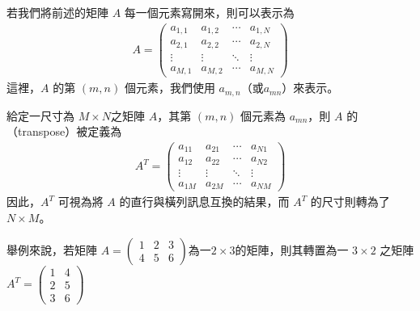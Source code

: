 \documentclass[letterpaper,10pt,english]{sphinxmanual}
\begin{document}
若我們將前述的矩陣 \(A\) 每一個元素寫開來，則可以表示為
\begin{equation*}
\begin{split}
A =
 \begin{pmatrix}
  a_{1,1} & a_{1,2} & \cdots & a_{1,N} \\
  a_{2,1} & a_{2,2} & \cdots & a_{2,N} \\
  \vdots  & \vdots  & \ddots & \vdots  \\
  a_{M,1} & a_{M,2} & \cdots & a_{M,N}
 \end{pmatrix}
\end{split}
\end{equation*}
這裡，\(A\) 的第 \((m,n)\) 個元素，我們使用 \(a_{m,n}\)（或\(a_{mn}\)）來表示。

給定一尺寸為 \(M \times N\)之矩陣 \(A\)，其第 \((m,n)\) 個元素為 \(a_{mn}\)，則 \(A\) 的（transpose）被定義為
\begin{equation*}
\begin{split}
A^T =
 \begin{pmatrix}
  a_{11} & a_{21} & \cdots & a_{N1} \\
  a_{12} & a_{22} & \cdots & a_{N2} \\
  \vdots  & \vdots  & \ddots & \vdots  \\
  a_{1M} & a_{2M} & \cdots & a_{NM}
 \end{pmatrix}
\end{split}
\end{equation*}
因此，\(A^T\) 可視為將 \(A\) 的直行與橫列訊息互換的結果，而 \(A^T\) 的尺寸則轉為了 \(N \times M\)。

舉例來說，若矩陣 \(A =  \begin{pmatrix}
  1 & 2 & 3  \\
  4 & 5 & 6
 \end{pmatrix}\)為一\(2 \times 3\)的矩陣，則其轉置為一 \(3 \times 2\) 之矩陣 \(A^T =  \begin{pmatrix}
  1 & 4 \\
  2 & 5 \\
  3 & 6
 \end{pmatrix}\)
\end{document}
